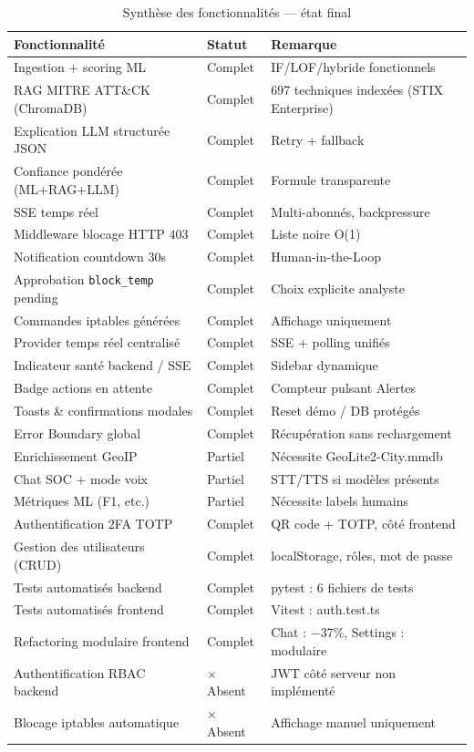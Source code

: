 \documentclass[12pt,a4paper]{report}
\begin{document}
\begin{table}[H]
\centering
\caption{Synthèse des fonctionnalités — état final}
\label{tab:synthese}
\begin{tabular}{|p{6cm}|p{2.5cm}|p{5cm}|}
\hline
\textbf{Fonctionnalité} & \textbf{Statut} & \textbf{Remarque} \\
\hline
Ingestion + scoring ML & Complet & IF/LOF/hybride fonctionnels \\
\hline
RAG MITRE ATT\&CK (ChromaDB) & Complet & 697 techniques indexées (STIX Enterprise) \\
\hline
Explication LLM structurée JSON & Complet & Retry + fallback \\
\hline
Confiance pondérée (ML+RAG+LLM) & Complet & Formule transparente \\
\hline
SSE temps réel & Complet & Multi-abonnés, backpressure \\
\hline
Middleware blocage HTTP 403 & Complet & Liste noire O(1) \\
\hline
Notification countdown 30s & Complet & Human-in-the-Loop \\
\hline
Approbation \texttt{block\_temp} pending & Complet & Choix explicite analyste \\
\hline
Commandes iptables générées & Complet & Affichage uniquement \\
\hline
Provider temps réel centralisé & Complet & SSE + polling unifiés \\
\hline
Indicateur santé backend / SSE & Complet & Sidebar dynamique \\
\hline
Badge actions en attente & Complet & Compteur pulsant Alertes \\
\hline
Toasts \& confirmations modales & Complet & Reset démo / DB protégés \\
\hline
Error Boundary global & Complet & Récupération sans rechargement \\
\hline
Enrichissement GeoIP & Partiel & Nécessite GeoLite2-City.mmdb \\
\hline
Chat SOC + mode voix & Partiel & STT/TTS si modèles présents \\
\hline
Métriques ML (F1, etc.) & Partiel & Nécessite labels humains \\
\hline
Authentification 2FA TOTP & Complet & QR code + TOTP, côté frontend \\
\hline
Gestion des utilisateurs (CRUD) & Complet & localStorage, rôles, mot de passe \\
\hline
Tests automatisés backend & Complet & pytest : 6 fichiers de tests \\
\hline
Tests automatisés frontend & Complet & Vitest : auth.test.ts \\
\hline
Refactoring modulaire frontend & Complet & Chat : $-$37\%, Settings : modulaire \\
\hline
Authentification RBAC backend & $\times$ Absent & JWT côté serveur non implémenté \\
\hline
Blocage iptables automatique & $\times$ Absent & Affichage manuel uniquement \\
\hline
\end{tabular}
\end{table}
\end{document}
